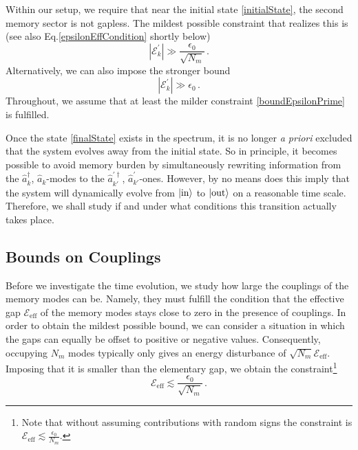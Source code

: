 \documentclass[aps,prd,reprint,superscriptaddress,nofootinbib]{revtex4-2}
\makeatletter
\newcommand*{\Eq}{Eq.\@\xspace}
\makeatother
\begin{document}
Within our setup, we require that near the initial state \eqref{initialState}, the second memory sector is not gapless. The mildest possible constraint that realizes this is (see also \Eq \eqref{epsilonEffCondition} shortly below)
\begin{equation} \label{boundEpsilonPrime}
\left|{\mathcal E}^{'}_k\right|\gg \frac{\epsilon_0}{\sqrt{N_m}} \,.
\end{equation}
Alternatively, we can also impose the stronger bound
\begin{equation} \label{boundEpsilonPrimeStronger}
	\left|{\mathcal E}^{'}_k\right|\gg \epsilon_0 \,.
\end{equation}
Throughout, we assume that at least the milder constraint \eqref{boundEpsilonPrime} is fulfilled.


Once the state \eqref{finalState} exists in the spectrum, it is no longer 
{\it a priori} excluded that the system evolves away from the initial state. So in principle, it becomes possible to avoid memory burden by simultaneously rewriting information from the $\hat{a}^{\dagger}_{k}$, $\hat{a}_{k}$-modes to the $\hat{a}^{'\dagger}_{k'}$, $\hat{a}^{'}_{k'}$-ones. However, by no means does this imply that the system will dynamically evolve from $\ket{\text{in}}$ to $\ket{\text{out}}$ on a reasonable time scale. Therefore, we shall study if and under what conditions this transition actually takes place.


\subsection{Bounds on Couplings}
Before we investigate the time evolution, we study how large the couplings of the memory modes can be. Namely, they must fulfill the condition that the effective gap $\mathcal{E}_{\text{eff}}$ of the memory modes stays close to zero in the presence of couplings. In order to obtain the mildest possible bound, we can consider a situation in which the gaps can equally be offset to positive or negative values. Consequently, occupying $N_m$ modes typically only gives an energy disturbance of $\sqrt{N_m} \mathcal{E}_{\text{eff}}$. Imposing that it is smaller than the elementary gap, we obtain the constraint\footnote{\label{footnote:random}Note that without assuming contributions with random signs the constraint is $\mathcal{E}_{\text{eff}} \lesssim \frac{\epsilon_0}{N_m}$.
}
\begin{equation} \label{epsilonEffCondition}
\mathcal{E}_{\text{eff}} \lesssim \frac{\epsilon_0}{\sqrt{N_m}} \,.
\end{equation}
\end{document}

